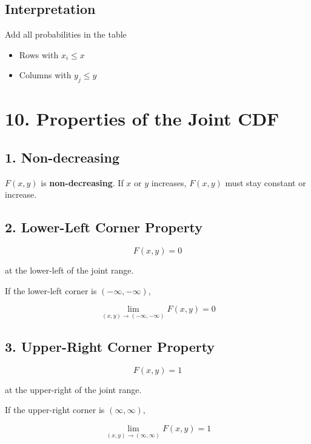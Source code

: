 \documentclass[12pt]{article}
\begin{document}
\subsection*{Interpretation}

Add all probabilities in the table

\begin{itemize}
\item Rows with $x_i \le x$
\item Columns with $y_j \le y$
\end{itemize}

\section*{10. Properties of the Joint CDF}

\subsection*{1. Non-decreasing}

$F(x,y)$ is \textbf{non-decreasing}.  
If $x$ or $y$ increases, $F(x,y)$ must stay constant or increase.

\subsection*{2. Lower-Left Corner Property}

\[
F(x,y) = 0
\]

at the lower-left of the joint range.

If the lower-left corner is $(-\infty,-\infty)$,

\[
\lim_{(x,y)\to(-\infty,-\infty)} F(x,y) = 0
\]

\subsection*{3. Upper-Right Corner Property}

\[
F(x,y) = 1
\]

at the upper-right of the joint range.

If the upper-right corner is $(\infty,\infty)$,

\[
\lim_{(x,y)\to(\infty,\infty)} F(x,y) = 1
\]
\end{document}
